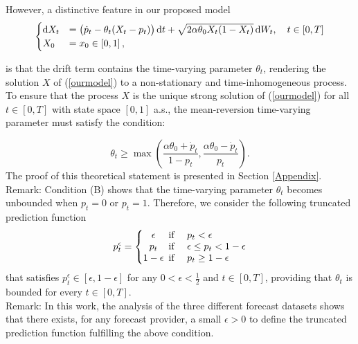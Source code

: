 \documentclass[11pt]{article}
\theoremstyle{definition}
\begin{document}
However, a distinctive feature in our proposed model 
\begin{equation}
\begin{cases}
    \dif X_t&= \left(\dot{p}_t  - \theta_t (X_t - p_t) \right) \dif t +\sqrt{2 \alpha \theta_0 X_t (1 - X_t)} \dif W_t, \quad t \in [0,T]  \\
   X_0 &=  x_0\in [0,1] \,,
\end{cases}
\label{ourmodel}
\end{equation}

is that the drift term contains the time-varying parameter $\theta_t$, rendering the solution $X$ of (\ref{ourmodel}) to a non-stationary and time-inhomogeneous process. To ensure that the process $X$ is the unique strong solution of (\ref{ourmodel}) for all $t \in [0,T]$ with state space $[0,1]$ a.s., the mean-reversion time-varying parameter must satisfy the condition:

\begin{equation}
\theta_t\geq \max\left(\frac{\alpha\theta_0+\dot p_t}{1-p_t},\frac{\alpha\theta_0-\dot p_t}{p_t}\right)\tag{B}. 
\end{equation} \label{condB}
The proof of this theoretical statement is presented in Section \ref{Appendix}. \\

Remark: Condition (B) shows that the time-varying parameter $\theta_t$ becomes unbounded when $p_t = 0$ or $p_t = 1$. Therefore, we consider the following truncated prediction function
\begin{equation}
  p_t^{\epsilon} = \left\{
  \begin{array}{@{}cl@{}}
    \epsilon \!\!\!&\text{if \quad} p_t  < \epsilon  \\
    p_t  \!\!\!&\text{if \quad}  \epsilon \leq p_t < 1 - \epsilon \\
    1 - \epsilon  \!\!\!&\text{if \quad}  p_t \geq 1 - \epsilon
 \end{array}\right.  \label{corrforecast}
\end{equation}
that satisfies $p_t^{\epsilon} \in [\epsilon, 1 - \epsilon]$ for any $0 < \epsilon < \frac{1}{2}$ and $t \in [0,T]$, providing that $\theta_t$ is bounded for every $t \in [0,T]$. \\

Remark: In this work, the analysis of the three different forecast datasets shows that there exists, for any forecast provider, a small $\epsilon >0$ to define the truncated prediction function fulfilling the above condition. \\
\end{document}
